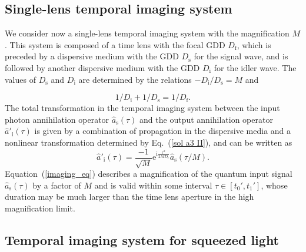 \documentclass[10pt,twocolumn]{article}
\begin{document}
\subsection{Single-lens temporal imaging system}

{%
We consider now a single-lens temporal imaging system with the magnification $M$. This system is composed of a time lens with the focal GDD $D_{\mathrm{f}}$, which is preceded by a dispersive medium with the GDD $D_{\mathrm{s}}$ for the signal wave, and is followed by another dispersive medium with the GDD $D_{\mathrm{i}}$ for the idler wave. The values of $D_{\mathrm{s}}$ and $D_{\mathrm{i}}$ are determined by the relations} $ -D_{\mathrm{i}}/D_{\mathrm{s}}=M$ and

%
\begin{equation}
     1/D_{\mathrm{i}}+1/D_{\mathrm{s}}=1/D_{\mathrm{f}}. \label{imaging_cond}
\end{equation}
%
{%
The total transformation in the temporal imaging system between the input photon annihilation operator $\hat{a}_{\mathrm{s}}(\tau)$ and the output annihilation operator $\hat{a}'_{\mathrm{i}}(\tau)$ is given by a combination of propagation in the dispersive media and a nonlinear transformation determined by Eq.~(\ref{sol a3 II}), and can be written as}
%
\begin{equation}
     \hat{a}'_{\mathrm{i}}(\tau)=
     \frac{-1}{\sqrt{M}}\mathrm{e}^{\mathrm{i}\frac{\tau^2}{2MD_{\mathrm{f}}}} \hat{a}_{\mathrm{s}}(\tau/M). \label{imaging_eq}
\end{equation}
%
{%
Equation~(\ref{imaging_eq}) describes a magnification of the quantum input signal $\hat{a}_{\mathrm{s}}(\tau)$ by a factor of $M$ and is valid within some interval $\tau\in [t_0',t_1']$, whose duration may be much larger than the time lens aperture in the high magnification limit.
}

\subsection{Temporal imaging system for squeezed light}
\end{document}
